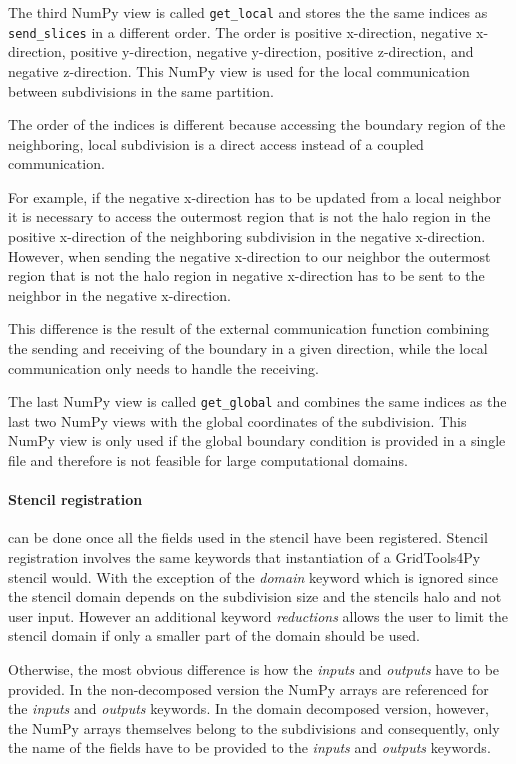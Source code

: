 The third NumPy view is called \texttt{get\_local} and stores the the same indices as \texttt{send\_slices} in a different order.
The order is positive x-direction, negative x-direction, positive y-direction, negative y-direction, positive z-direction, and negative z-direction.
This NumPy view is used for the local communication between subdivisions in the same partition.

The order of the indices is different because accessing the boundary region of the neighboring, local subdivision is a direct access instead of a coupled communication.

For example, if the negative x-direction has to be updated from a local neighbor it is necessary to access the outermost region that is not the halo region in the positive x-direction of the neighboring subdivision in the negative x-direction.
However, when sending the negative x-direction to our neighbor the outermost region that is not the halo region in negative x-direction has to be sent to the neighbor in the negative x-direction.

This difference is the result of the external communication function combining the sending and receiving of the boundary in a given direction, while the local communication only needs to handle the receiving.

The last NumPy view is called \texttt{get\_global} and combines the same indices as the last two NumPy views with the global coordinates of the subdivision.
This NumPy view is only used if the global boundary condition is provided in a single file and therefore is not feasible for large computational domains.

\paragraph{Stencil registration } can be done once all the fields used in the stencil have been registered.
Stencil registration involves the same keywords that instantiation of a GridTools4Py stencil would.
With the exception of the \textit{domain} keyword which is ignored since the stencil domain depends on the subdivision size and the stencils halo and not user input.
However an additional keyword \textit{reductions} allows the user to limit the stencil domain if only a smaller part of the domain should be used.

Otherwise, the most obvious difference is how the \textit{inputs} and \textit{outputs} have to be provided.
In the non-decomposed version the NumPy arrays are referenced for the \textit{inputs} and \textit{outputs} keywords.
In the domain decomposed version, however, the NumPy arrays themselves belong to the subdivisions and consequently, only the name of the fields have to be provided to the \textit{inputs} and \textit{outputs} keywords.

